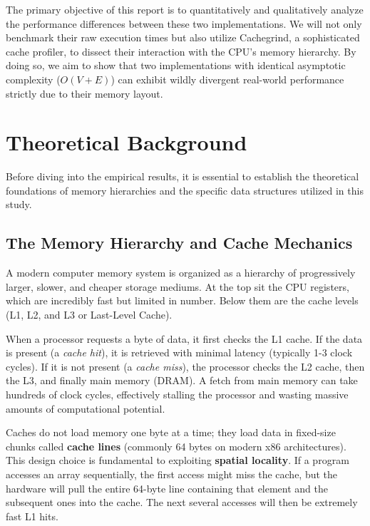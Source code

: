 \documentclass[11pt]{article}
\begin{document}
The primary objective of this report is to quantitatively and qualitatively analyze the performance differences between these two implementations. We will not only benchmark their raw execution times but also utilize Cachegrind, a sophisticated cache profiler, to dissect their interaction with the CPU's memory hierarchy. By doing so, we aim to show that two implementations with identical asymptotic complexity ($O(V + E)$) can exhibit wildly divergent real-world performance strictly due to their memory layout.

\section{Theoretical Background}

Before diving into the empirical results, it is essential to establish the theoretical foundations of memory hierarchies and the specific data structures utilized in this study.

\subsection{The Memory Hierarchy and Cache Mechanics}

A modern computer memory system is organized as a hierarchy of progressively larger, slower, and cheaper storage mediums. At the top sit the CPU registers, which are incredibly fast but limited in number. Below them are the cache levels (L1, L2, and L3 or Last-Level Cache). 

When a processor requests a byte of data, it first checks the L1 cache. If the data is present (a \textit{cache hit}), it is retrieved with minimal latency (typically 1-3 clock cycles). If it is not present (a \textit{cache miss}), the processor checks the L2 cache, then the L3, and finally main memory (DRAM). A fetch from main memory can take hundreds of clock cycles, effectively stalling the processor and wasting massive amounts of computational potential.

Caches do not load memory one byte at a time; they load data in fixed-size chunks called \textbf{cache lines} (commonly 64 bytes on modern x86 architectures). This design choice is fundamental to exploiting \textbf{spatial locality}. If a program accesses an array sequentially, the first access might miss the cache, but the hardware will pull the entire 64-byte line containing that element and the subsequent ones into the cache. The next several accesses will then be extremely fast L1 hits.
\end{document}
